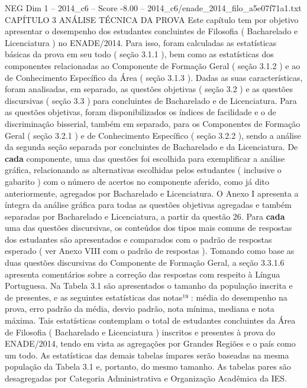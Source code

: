\begin{textsample}{NEG Dim 1 – 2014\_c6 – Score -8.00 – 2014\_c6/enade\_2014\_filo\_a5e07f71a1.txt}  \label{ex:f1_neg_019}
CAPÍTULO 3 ANÁLISE TÉCNICA DA PROVA Este capítulo tem por objetivo apresentar o desempenho dos estudantes concluintes de Filosofia ( Bacharelado e Licenciatura ) no ENADE/2014.
Para isso, foram calculadas as estatísticas básicas da prova em seu todo ( seção 3.1.1 ), bem como as estatísticas dos componentes relacionadas ao Componente de Formação Geral ( seção 3.1.2 ) e ao de Conhecimento Específico da Área ( seção 3.1.3 ).
Dadas as suas características, foram analisadas, em separado, as questões objetivas ( seção 3.2 ) e as questões discursivas ( seção 3.3 ) para concluintes de Bacharelado e de Licenciatura.
Para as questões objetivas, foram disponibilizados os índices de facilidade e o de discriminação bisserial, também em separado, para os Componentes de Formação Geral ( seção 3.2.1 ) e de Conhecimento Específico ( seção 3.2.2 ), sendo a análise da segunda seção separada por concluintes de Bacharelado e da Licenciatura.
De \textbf{cada} componente, uma das questões foi escolhida para exemplificar a análise gráfica, relacionando as alternativas escolhidas pelos estudantes ( inclusive o gabarito ) com o número de acertos no componente aferido, como já dito anteriormente, agregados por Bacharelado e Licenciatura.
O Anexo I apresenta a íntegra da análise gráfica para todas as questões objetivas agregadas e também separadas por Bacharelado e Licenciatura, a partir da questão 26.
Para \textbf{cada} uma das questões discursivas, os conteúdos dos tipos mais comuns de respostas dos estudantes são apresentados e comparados com o padrão de respostas esperado ( ver Anexo VIII com o padrão de respostas ).
Tomando como base as duas questões discursivas do Componente de Formação Geral, a seção 3.3.1.6 apresenta comentários sobre a correção das respostas com respeito à Língua Portuguesa.
Na Tabela 3.1 são apresentados o tamanho da população inscrita e de presentes, e as seguintes estatísticas das notas¹⁹ : média do desempenho na prova, erro padrão da média, desvio padrão, nota mínima, mediana e nota máxima.
Tais estatísticas contemplam o total de estudantes concluintes da Área de Filosofia ( Bacharelado e Licenciatura ) inscritos e presentes à prova do ENADE/2014, tendo em vista as agregações por Grandes Regiões e o país como um todo.
As estatísticas das demais tabelas ímpares serão baseadas na mesma população da Tabela 3.1 e, portanto, do mesmo tamanho.
As tabelas pares são desagregadas por Categoria Administrativa e Organização Acadêmica da IES.

\end{textsample}
